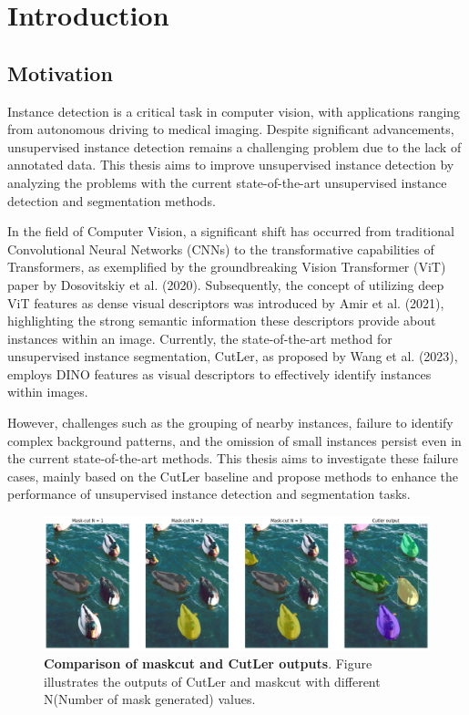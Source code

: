 \chapter{Introduction}\label{chap:introduction}

\section{Motivation}
Instance detection is a critical task in computer vision, with applications ranging from autonomous driving to medical imaging. Despite significant advancements, unsupervised instance detection remains a challenging problem due to the lack of annotated data. This thesis aims to improve unsupervised instance detection by analyzing the problems with the current state-of-the-art unsupervised instance detection and segmentation methods.

In the field of Computer Vision, a significant shift has occurred from traditional Convolutional Neural Networks (CNNs) to the transformative capabilities of Transformers, as exemplified by the groundbreaking Vision Transformer (ViT) paper by Dosovitskiy et al. (2020)\cite{dosovitskiy2020image}. Subsequently, the concept of utilizing deep ViT features as dense visual descriptors was introduced by Amir et al. (2021)\cite{amir2021deep}, highlighting the strong semantic information these descriptors provide about instances within an image. Currently, the state-of-the-art method for unsupervised instance segmentation, CutLer, as proposed by Wang et al. (2023)\cite{wang2023cut}, employs DINO features\cite{caron2021emerging} as visual descriptors to effectively identify instances within images.

However, challenges such as the grouping of nearby instances, failure to identify complex background patterns, and the omission of small instances persist even in the current state-of-the-art methods. This thesis aims to investigate these failure cases, mainly based on the CutLer \cite{wang2023cut} baseline and propose methods to enhance the performance of unsupervised instance detection and segmentation tasks.

%
\begin{figure}
	\centering
	\includegraphics[width=1\textwidth]{Images/main/mask_cut_cutler_comparison.png}
	\caption[\textbf{Comparison of maskcut and CutLer outputs}]{\textbf{Comparison of maskcut and CutLer outputs}. Figure illustrates the outputs of CutLer and maskcut with different N(Number of mask generated) values.}
	\label{fig:mask_cut_cutler_comparison}
\end{figure}

